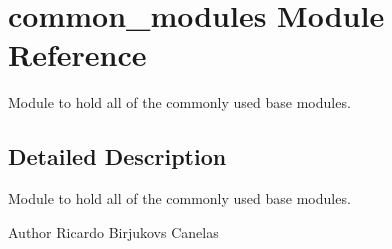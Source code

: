 \hypertarget{namespacecommon__modules}{}\section{common\+\_\+modules Module Reference}
\label{namespacecommon__modules}


Module to hold all of the commonly used base modules.  




\subsection{Detailed Description}
Module to hold all of the commonly used base modules. 

\begin{DoxyAuthor}{Author}
Ricardo Birjukovs Canelas 
\end{DoxyAuthor}
